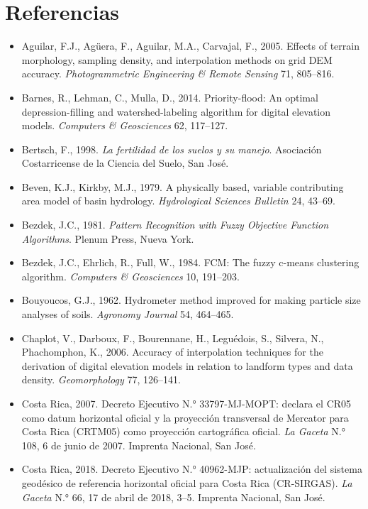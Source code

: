 \documentclass[10pt]{article}
\begin{document}
\section*{Referencias}
{\fontsize{8.3}{12.2}\linespread{1}\selectfont
\begin{itemize}[label={}, leftmargin=1.2em, itemindent=-1.2em, itemsep=0.45em]
  \item Aguilar, F.J., Agüera, F., Aguilar, M.A., Carvajal, F., 2005. Effects of terrain morphology, sampling density, and interpolation methods on grid DEM accuracy. \emph{Photogrammetric Engineering \& Remote Sensing} 71, 805–816.
  \item Barnes, R., Lehman, C., Mulla, D., 2014. Priority-flood: An optimal depression-filling and watershed-labeling algorithm for digital elevation models. \emph{Computers \& Geosciences} 62, 117–127.
  \item Bertsch, F., 1998. \emph{La fertilidad de los suelos y su manejo}. Asociación Costarricense de la Ciencia del Suelo, San José.
  \item Beven, K.J., Kirkby, M.J., 1979. A physically based, variable contributing area model of basin hydrology. \emph{Hydrological Sciences Bulletin} 24, 43–69.
  \item Bezdek, J.C., 1981. \emph{Pattern Recognition with Fuzzy Objective Function Algorithms}. Plenum Press, Nueva York.
  \item Bezdek, J.C., Ehrlich, R., Full, W., 1984. FCM: The fuzzy c-means clustering algorithm. \emph{Computers \& Geosciences} 10, 191–203.
  \item Bouyoucos, G.J., 1962. Hydrometer method improved for making particle size analyses of soils. \emph{Agronomy Journal} 54, 464–465.
  \item Chaplot, V., Darboux, F., Bourennane, H., Leguédois, S., Silvera, N., Phachomphon, K., 2006. Accuracy of interpolation techniques for the derivation of digital elevation models in relation to landform types and data density. \emph{Geomorphology} 77, 126–141.
  \item Costa Rica, 2007. Decreto Ejecutivo N.° 33797-MJ-MOPT: declara el CR05 como datum horizontal oficial y la proyección transversal de Mercator para Costa Rica (CRTM05) como proyección cartográfica oficial. \emph{La Gaceta} N.° 108, 6 de junio de 2007. Imprenta Nacional, San José.
  \item Costa Rica, 2018. Decreto Ejecutivo N.° 40962-MJP: actualización del sistema geodésico de referencia horizontal oficial para Costa Rica (CR-SIRGAS). \emph{La Gaceta} N.° 66, 17 de abril de 2018, 3–5. Imprenta Nacional, San José.

\end{itemize}}
\end{document}
